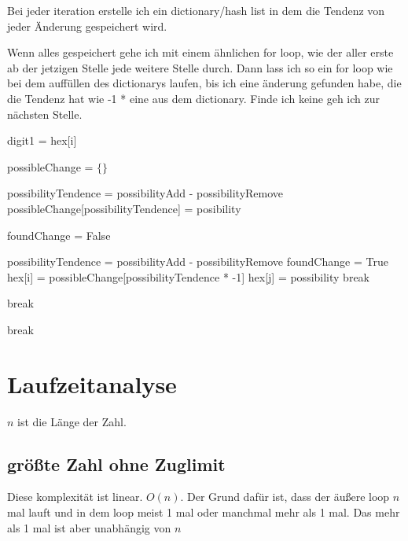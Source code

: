 \documentclass[a4paper,10pt,ngerman]{scrartcl}
\begin{document}
Bei jeder iteration erstelle ich ein dictionary/hash list in dem die Tendenz von jeder Änderung gespeichert wird. 

Wenn alles gespeichert gehe ich mit einem ähnlichen for loop, wie der aller erste ab der jetzigen Stelle jede weitere Stelle durch. Dann lass ich so ein for loop wie bei dem auffüllen des dictionarys laufen, bis ich eine änderung gefunden habe, die die Tendenz hat wie -1 * eine aus dem dictionary. Finde ich keine geh ich zur nächsten Stelle.

\begin{algorithmic}[1]
\State digit1 = hex[i]

\State possibleChange = $\{\}$

\State possibilityTendence = possibilityAdd - possibilityRemove
\State possibleChange[possibilityTendence] = posibility
\EndIf 
{}
\EndFor


\State foundChange = False

\State possibilityTendence = possibilityAdd - possibilityRemove
\State foundChange = True
\State hex[i] = possibleChange[possibilityTendence * -1]
\State hex[j] = possibility
\State break
\EndIf
\EndFor

\State break
\EndIf
\EndFor

\State break
\EndIf
\EndFor

\end{algorithmic}



\section{Laufzeitanalyse}

$n$ ist die Länge der Zahl.

\subsection{größte Zahl ohne Zuglimit}

Diese komplexität ist linear. $O(n)$. Der Grund dafür ist, dass der äußere loop $n$ mal lauft und in dem loop meist 1 mal oder manchmal mehr als 1 mal. Das mehr als 1 mal ist aber unabhängig von $n$
\end{document}
